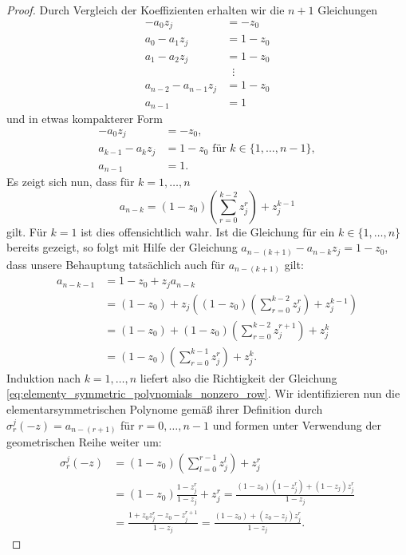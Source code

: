 \begin{proof}
    \noindent Durch Vergleich der Koeffizienten erhalten wir die $n+1$
    Gleichungen
    \begin{equation*}
        \begin{split}
            -a_0 z_j              &= -z_0\\
            a_0 - a_1 z_j         &= 1 - z_0\\
            a_1 - a_2 z_j         &= 1 - z_0\\
                                  &\;\; \vdots\\
            a_{n-2} - a_{n-1} z_j &= 1 - z_0\\
            a_{n-1}               &= 1
        \end{split}
    \end{equation*}
    und in etwas kompakterer Form
    \[
        \begin{split}
            -a_0 z_j            &= -z_0, \\
            a_{k-1} - a_{k} z_j &= 1 - z_0 \text{ für } k \in \{1, \dots, n-1\},\\
            a_{n-1}             &= 1.
        \end{split}
    \]
    Es zeigt sich nun, dass für $k=1, \dots, n$
    \begin{equation}
        \label{eq:elementy_symmetric_polynomials_nonzero_row}
        a_{n-k}
        = (1 - z_0) \left( \sum_{r=0}^{k-2} z_j^r \right) + z_j^{k-1}
    \end{equation}
    gilt.
    Für $k=1$ ist dies offensichtlich wahr.
    Ist die Gleichung für ein $k \in \{1, \dots, n\}$ bereits gezeigt, so folgt
    mit Hilfe der Gleichung
    $a_{n-(k+1)} - a_{n-k} z_j = 1 - z_0$, dass unsere Behauptung tatsächlich
    auch für $a_{n-(k+1)}$ gilt:
    \[
        \begin{split}
            a_{n-k-1}
            &= 1-z_0 + z_j a_{n-k}\\
            &= (1-z_0) + z_j \left( (1 - z_0) \left( \sum_{r=0}^{k-2} z_j^r \right) + z_j^{k-1} \right)\\
            &= (1-z_0) + (1 - z_0) \left( \sum_{r=0}^{k-2} z_j^{r+1} \right) + z_j^{k}\\
            &= (1 - z_0) \left( \sum_{r=0}^{k-1} z_j^r \right) + z_j^{k}.
        \end{split}
    \]
    Induktion nach $k = 1, \dots, n$ liefert also die Richtigkeit der Gleichung
    \eqref{eq:elementy_symmetric_polynomials_nonzero_row}.
    Wir identifizieren nun die elementarsymmetrischen Polynome gemäß ihrer
    Definition durch
    ${\sigma_r^j(-z) = a_{n-(r+1)}}$ für $r=0, \dots, n-1$ und
    formen unter Verwendung der geometrischen Reihe weiter um:
    \[
        \begin{split}
            \sigma_r^j(-z)
            &= (1 - z_0) \left( \sum_{l=0}^{r-1} z_j^l \right) + z_j^{r}\\
            &= (1 - z_0) \frac{1-z_j^r}{1-z_j} + z_j^{r}
            = \frac{(1-z_0)(1-z_j^r) + (1-z_j) z_j^r}{1-z_j}\\
            &= \frac{1 + z_0 z_j^r - z_0 - z_j^{r+1}}{1-z_j}
            = \frac{(1 - z_0) + (z_0 - z_j) z_j^r}{1-z_j}.
        \end{split}
    \]


\end{proof}

